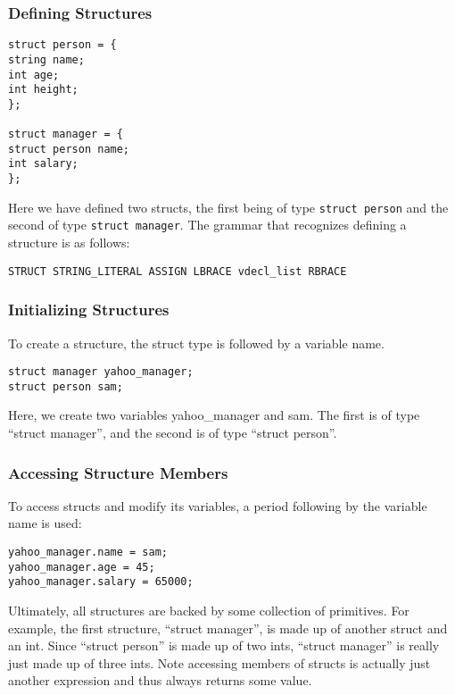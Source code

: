 \documentclass{article}
\begin{document}
\subsubsection{Defining Structures}

\begin{lstlisting}
struct person = {
string name;
int age;
int height;
};

struct manager = {
struct person name;
int salary;
};
\end{lstlisting}
Here we have defined two structs, the first being of type \texttt{struct person} and the second of type \texttt{struct manager}.  The grammar that recognizes defining a structure is as follows:

\begin{Verbatim}[frame=single]
STRUCT STRING_LITERAL ASSIGN LBRACE vdecl_list RBRACE
\end{Verbatim}

\subsubsection{Initializing Structures}
To create a structure, the struct type is followed by a variable name. 
\begin{lstlisting}
struct manager yahoo_manager;
struct person sam;
\end{lstlisting}

Here, we create two variables yahoo\_manager and sam. The first is of type ``struct manager'', and the second is of type ``struct person''.

\subsubsection{Accessing Structure Members}

 To access structs and modify its variables, a period following by the variable name is used:

 \begin{lstlisting}
yahoo_manager.name = sam;
yahoo_manager.age = 45;
yahoo_manager.salary = 65000;
\end{lstlisting}
 Ultimately, all structures are backed by some collection of primitives. For example, the first structure, ``struct manager'', is made up of another struct and an int. Since ``struct person'' is made up of two ints, ``struct manager'' is really just made up of three ints. Note accessing members of structs is actually just another expression and thus always returns some value.
 
\end{document}
